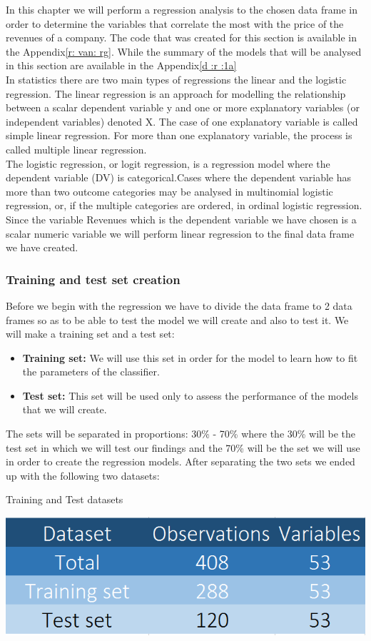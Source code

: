 \documentclass{book}
\begin{document}
In this chapter we will perform a regression analysis to the chosen data frame in order to determine the variables that correlate the most with the price of the revenues of a company. The code that was created for this section is available in the Appendix\ref{r: van: rg}. While the summary of the models that will be analysed in this section are available in the Appendix\ref{d :r :1a}\\
In statistics there are two main types of regressions the linear and the logistic regression. The linear regression is an approach for modelling the relationship between a scalar dependent variable y and one or more explanatory variables (or independent variables) denoted X. The case of one explanatory variable is called simple linear regression. For more than one explanatory variable, the process is called multiple linear regression.\\
The logistic regression, or logit regression, is a regression model where the dependent variable (DV) is categorical.Cases where the dependent variable has more than two outcome categories may be analysed in multinomial logistic regression, or, if the multiple categories are ordered, in ordinal logistic regression.\\
Since the variable Revenues which is the dependent variable we have chosen is a scalar numeric variable we will perform linear regression to the final data frame we have created.
\subsubsection{Training and test set creation}
Before we begin with the regression we have to divide the data frame to 2 data frames so as to be able to test the model we will create and also to test it. We will make a training set and a test set:
\begin{itemize}
\item \textbf{Training set:} We will use this set in order for the model to learn how to fit the parameters of the classifier.
\item \textbf{Test set:} This set will be used only to assess the performance of the models that we will create.
\end{itemize}  
The sets will be separated in proportions: 30\% - 70\% where the 30\% will be the test set in which we will test our findings and the 70\% will be the set we will use in order to create the regression models. After separating the two sets we ended up with the following two datasets:
\begin{table}[H]
\centering
\caption{Training and Test datasets}
\includegraphics[scale=0.6]{../R/photos/002_dataset_tr_t.PNG} 
\end{table}
\end{document}
